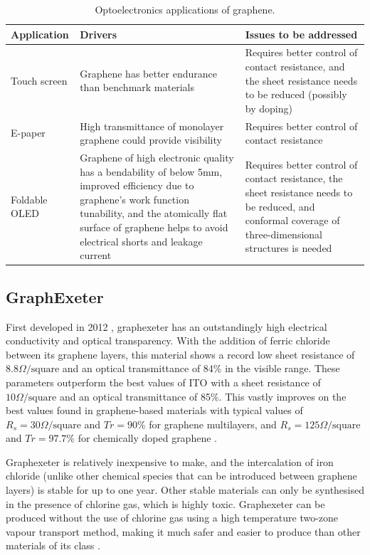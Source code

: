 \documentclass[12pt,titlepage]{article}
\begin{document}
	\begin{table}
		\begin{scriptsize}	
			\begin{tabularx}{\textwidth}{X X X}
				\hline
				Application & Drivers & Issues to be addressed \\
				\hline
				Touch screen & Graphene has better endurance than benchmark materials & Requires better control of contact resistance, and the sheet resistance needs to be reduced (possibly by doping) \\
				\hline
				E-paper & High transmittance of monolayer graphene could provide visibility &  Requires better control of contact resistance \\
				\hline
				Foldable OLED & Graphene of high electronic quality has a bendability of below 5mm, improved efficiency due to graphene’s work function tunability, and the atomically flat surface of graphene helps to avoid electrical shorts and leakage current & Requires better control of contact resistance, the sheet resistance needs to be reduced, and conformal coverage of three-dimensional structures is needed \\
				\hline
			\end{tabularx}
		\end{scriptsize}
		\caption[Optoelectronics applications of graphene.]{Optoelectronics applications of graphene. \cite{Novoselov2012}}
		\label{tab:electronic}
	\end{table}
	
	\subsection{GraphExeter}
	First developed in 2012 \cite{Khrapach2012a}, graphexeter has an outstandingly high electrical conductivity and optical transparency. With the addition of ferric chloride between its graphene layers, this material shows a record low sheet resistance of $8.8 \Omega/\text{square}$ and an optical transmittance of 84\% in the visible range. These parameters outperform the best values of ITO with a sheet resistance of $10 \Omega/\text{square}$ and an optical transmittance of 85\%. This vastly improves on the best values found in graphene-based materials with typical values of $R_s = 30 \Omega/\text{square}$ and $Tr = 90\%$ for graphene multilayers, and $R_s = 125 \Omega/\text{square}$ and $Tr = 97.7\%$ for chemically doped graphene \cite{Bae2010}. 
	
	Graphexeter is relatively inexpensive to make, and the intercalation of iron chloride (unlike other chemical species that can be introduced between graphene layers) is stable for up to one year. Other stable materials can only be synthesised in the presence of chlorine gas, which is highly toxic. Graphexeter can be produced without the use of chlorine gas using a high temperature two-zone vapour transport method, making it much safer and easier to produce than other materials of its class \cite{Khrapach2012a}.
	  
\end{document}
